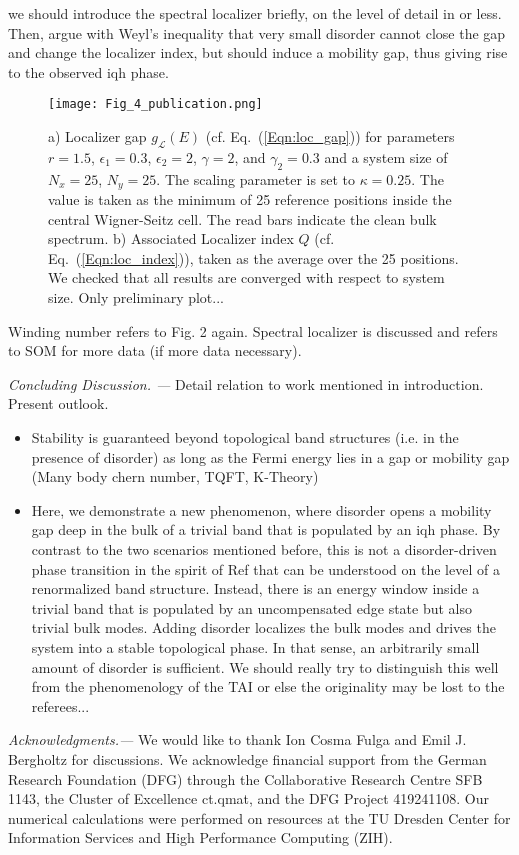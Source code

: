 \documentclass[aps,prl,amsmath,amssymb,twocolumn]{revtex4-2}
\newcommand{\JCB}[1]{{\color{green} #1}}
\newcommand{\BM}[1]{{\color{orange} #1}}
\newcommand{\eq}[1]{Eq.~(\ref{#1})}
\begin{document}
\BM{we should introduce the spectral localizer briefly, on the level of detail in \cite{Fulga_Bergholtz} or less. Then, argue with Weyl's inequality that very small disorder cannot close the gap and change the localizer index, but should induce a mobility gap, thus giving rise to the observed \gls{iqh} phase.}


\begin{figure}[htp!]	 
{\texttt{[image: Fig\_4\_publication.png]}}
\caption{a) Localizer gap $g_{\mathcal L}(E)$ (cf. \eq{Eqn:loc_gap}) for parameters $r = 1.5$, $\epsilon_1 = 0.3$, $\epsilon_2 = 2$, $\gamma  =2$, and $\gamma_2 = 0.3$ and a system size of $N_x = 25$, $N_y = 25$. The scaling parameter is set to $\kappa = 0.25$. The value is taken as the minimum of 25 reference positions inside the central Wigner-Seitz cell. The read bars indicate the clean bulk spectrum. b) Associated Localizer index $Q$ (cf. \eq{Eqn:loc_index}), taken as the average over the 25 positions. We checked that all results are converged with respect to system size. \BM{Only preliminary plot...} }\label{Fig:spec_loc}
\end{figure}

\JCB{
Winding number refers to Fig. 2 again. Spectral localizer is discussed and refers to SOM for more data (if more data necessary).
}

{\it Concluding Discussion. ---} 
\JCB{
Detail relation to work mentioned in introduction. Present outlook.
}

\begin{itemize}


\item Stability is guaranteed beyond topological band structures (i.e. in the presence of disorder) as long as the Fermi energy lies in a gap or mobility gap (Many body chern number, TQFT, K-Theory)



\item Here, we demonstrate a new phenomenon, where disorder opens a mobility gap deep in the bulk of a trivial band that is populated by an \gls{iqh} phase. By contrast to the two scenarios mentioned before, this is not a disorder-driven phase transition in the spirit of Ref \cite{TAI_1, TAI_2} that can be understood on the level of a renormalized band structure. Instead, there is an energy window inside a trivial band that is populated by an uncompensated edge state but also trivial bulk modes. Adding disorder localizes the bulk modes and drives the system into a stable topological phase. In that sense, an arbitrarily small amount of disorder is sufficient. \BM{We should really try to distinguish this well from the phenomenology of the TAI or else the originality may be lost to the referees...}
\end{itemize}
\acknowledgments
{\it Acknowledgments.---}
We would like to thank Ion Cosma Fulga and Emil J. Bergholtz for discussions. We acknowledge financial support from the German Research Foundation (DFG) through the Collaborative Research Centre SFB 1143, the Cluster of Excellence ct.qmat, and the DFG Project 419241108. Our numerical calculations were performed on resources at the TU Dresden Center for Information Services and High Performance Computing (ZIH).
\end{document}
